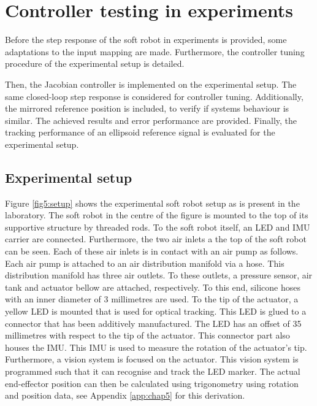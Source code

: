 \section{Controller testing in experiments}



Before the step response of the soft robot in experiments is provided, some adaptations to the input mapping are made. Furthermore, the controller tuning procedure of the experimental setup is detailed. 



Then, the Jacobian controller is implemented on the experimental setup. The same closed-loop step response is considered for controller tuning. Additionally, the mirrored reference position is included, to verify if systems behaviour is similar. The achieved results and error performance are provided. Finally, the tracking performance of an ellipsoid reference signal is evaluated for the experimental setup. 



\subsection*{Experimental setup}

Figure \ref{fig5:setup} shows the experimental soft robot setup as is present in the laboratory. The soft robot in the centre of the figure is mounted to the top of its supportive structure by threaded rods. To the soft robot itself, an LED and IMU carrier are connected. Furthermore, the two air inlets a the top of the soft robot can be seen. Each of these air inlets is in contact with an air pump as follows. Each air pump is attached to an air distribution manifold via a hose. This distribution manifold has three air outlets. To these outlets, a pressure sensor, air tank and actuator bellow are attached, respectively. To this end, silicone hoses with an inner diameter of 3 millimetres are used. To the tip of the actuator, a yellow LED is mounted that is used for optical tracking. This LED is glued to a connector that has been additively manufactured. The LED has an offset of 35 millimetres with respect to the tip of the actuator. This connector part also houses the IMU. This IMU is used to measure the rotation of the actuator's tip. Furthermore, a vision system is focused on the actuator. This vision system is programmed such that it can recognise and track the LED marker. The actual end-effector position can then be calculated using trigonometry using rotation and position data, see Appendix \ref{app:chap5} for this derivation.



